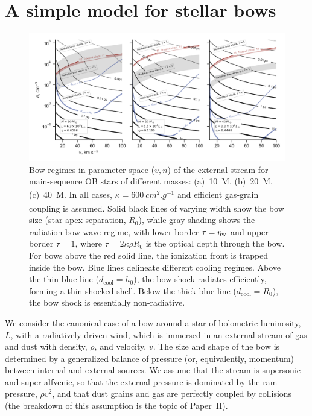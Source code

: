 \section{A simple model for stellar bows}
\label{sec:strong-gas-grain}

\begin{figure}
  \includegraphics[width=\linewidth]{figs/zones-v-n-plane}
  \caption{Bow regimes in parameter space (\(v, n\)) of the external
    stream for main-sequence OB stars of different masses:
    (a)~\SI{10}{M_\odot}, (b)~\SI{20}{M_\odot}, (c)~\SI{40}{M_\odot}.  In all
    cases, \(\kappa = \SI{600}{cm^2.g^{-1}}\) and efficient gas-grain
    coupling is assumed. Solid black lines of varying width show the
    bow size (star-apex separation, \(R_0\)), while gray shading shows
    the radiation bow wave regime, with lower border \(\tau = \eta_{\text{w}}\) and
    upper border \(\tau = 1\), where \(\tau = 2 \kappa \rho R_0\) is the optical
    depth through the bow.  For bows above the red solid line, the
    ionization front is trapped inside the bow.  Blue lines delineate
    different cooling regimes.  Above the thin blue line
    (\(d_{\text{cool}} = h_0\)), the bow shock radiates efficiently,
    forming a thin shocked shell.  Below the thick blue line
    (\(d_{\text{cool}} = R_0\)), the bow shock is essentially
    non-radiative.}
  \label{fig:zones-v-n-plane}
\end{figure}


We consider the canonical case of a bow around a star of bolometric
luminosity, \(L\), with a radiatively driven wind, which is immersed
in an external stream of gas and dust with density, \(\rho\), and
velocity, \(v\).  The size and shape of the bow is determined by a
generalized balance of pressure (or, equivalently, momentum) between
internal and external sources.  We assume that the stream is
supersonic and super-alfvenic, so that the external pressure is
dominated by the ram pressure, \(\rho v^2\), and that dust grains and gas
are perfectly coupled by collisions (the breakdown of this assumption
is the topic of Paper~II).

